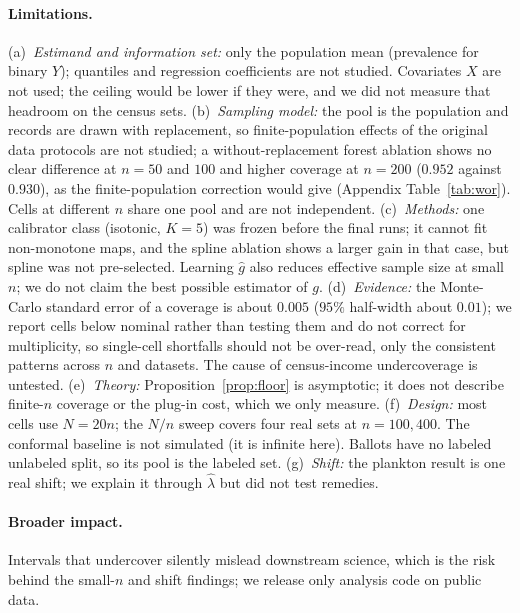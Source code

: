 \paragraph{Limitations.} (a)~\emph{Estimand and information set:} only the population mean (prevalence for binary $Y$); quantiles and regression coefficients are not studied. Covariates $X$ are not used; the ceiling would be lower if they were, and we did not measure that headroom on the census sets. (b)~\emph{Sampling model:} the pool is the population and records are drawn with replacement, so finite-population effects of the original data protocols are not studied; a without-replacement forest ablation shows no clear difference at $n=50$ and $100$ and higher coverage at $n=200$ ($0.952$ against $0.930$), as the finite-population correction would give (Appendix Table~\ref{tab:wor}). Cells at different $n$ share one pool and are not independent. (c)~\emph{Methods:} one calibrator class (isotonic, $K=5$) was frozen before the final runs; it cannot fit non-monotone maps, and the spline ablation shows a larger gain in that case, but spline was not pre-selected. Learning $\hat g$ also reduces effective sample size at small $n$; we do not claim the best possible estimator of $g$. (d)~\emph{Evidence:} the Monte-Carlo standard error of a coverage is about $0.005$ ($95\%$ half-width about $0.01$); we report cells below nominal rather than testing them and do not correct for multiplicity, so single-cell shortfalls should not be over-read, only the consistent patterns across $n$ and datasets. The cause of census-income undercoverage is untested. (e)~\emph{Theory:} Proposition~\ref{prop:floor} is asymptotic; it does not describe finite-$n$ coverage or the plug-in cost, which we only measure. (f)~\emph{Design:} most cells use $N=20n$; the $N/n$ sweep covers four real sets at $n=100,400$. The conformal baseline is not simulated (it is infinite here). Ballots have no labeled unlabeled split, so its pool is the labeled set. (g)~\emph{Shift:} the plankton result is one real shift; we explain it through $\hat\lambda$ but did not test remedies.

\paragraph{Broader impact.} Intervals that undercover silently mislead downstream science, which is the risk behind the small-$n$ and shift findings; we release only analysis code on public data.
